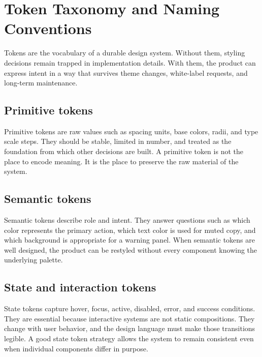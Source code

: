 \documentclass[11pt,twoside,a4paper]{article}
\begin{document}
\section{Token Taxonomy and Naming Conventions}
Tokens are the vocabulary of a durable design system. Without them, styling decisions remain trapped in implementation details. With them, the product can express intent in a way that survives theme changes, white-label requests, and long-term maintenance.

\subsection{Primitive tokens}
Primitive tokens are raw values such as spacing units, base colors, radii, and type scale steps. They should be stable, limited in number, and treated as the foundation from which other decisions are built. A primitive token is not the place to encode meaning. It is the place to preserve the raw material of the system.

\subsection{Semantic tokens}
Semantic tokens describe role and intent. They answer questions such as which color represents the primary action, which text color is used for muted copy, and which background is appropriate for a warning panel. When semantic tokens are well designed, the product can be restyled without every component knowing the underlying palette.

\subsection{State and interaction tokens}
State tokens capture hover, focus, active, disabled, error, and success conditions. They are essential because interactive systems are not static compositions. They change with user behavior, and the design language must make those transitions legible. A good state token strategy allows the system to remain consistent even when individual components differ in purpose.
\end{document}
